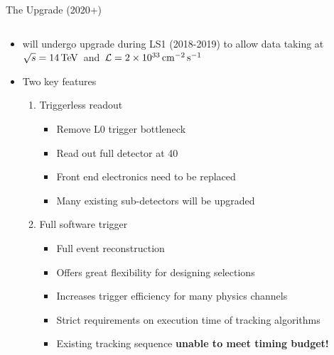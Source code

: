 \documentclass[aspectratio=1610]{beamer}
\begin{document}
\begin{frame}{The \lhcb Upgrade (2020+)}

\begin{columns}
\begin{column}{0.6\textwidth}
  \begin{itemize}
    \item \lhcb  will undergo upgrade during LS1 (2018-2019) to allow data taking at \mbox{$\protect\sqrt{s}=14\mathrm{\,Te\kern -0.1em V}$ and $\mathcal{L}=2\times10^{33}\mathrm{ \,cm}^{-2}\mathrm{{\,s}}^{-1}$}
  \end{itemize}

  \begin{itemize}
    \item Two key features
    \begin{enumerate}
      \item Triggerless readout
      \begin{itemize}
        \item[\ding{70}] Remove L0 trigger bottleneck
        \item[\ding{70}] Read out full detector at 40\mhz
        \item[\ding{80}] Front end electronics need to be replaced
        \item[\ding{80}] Many existing sub-detectors will be upgraded
      \end{itemize}
      \item Full software trigger
      \begin{itemize}
        \item[\ding{70}] Full event reconstruction
        \item[\ding{70}] Offers great flexibility for designing selections
        \item[\ding{70}] Increases trigger efficiency for many physics channels
        \item[\ding{80}] Strict requirements on execution time of tracking algorithms
        \item[\ding{80}] Existing tracking sequence {\bf unable to meet timing budget!}
      \end{itemize}
    \end{enumerate}
  \end{itemize}


\end{column}
\end{columns}
\end{frame}
\end{document}
